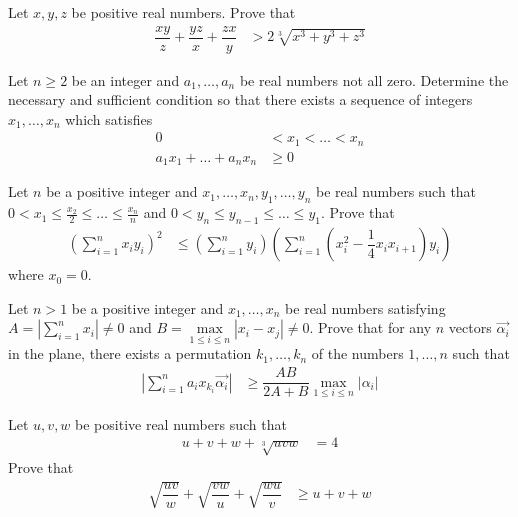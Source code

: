 \documentclass{subfile}
\begin{document}
		\begin{problem}
			Let $x,y,z$ be positive real numbers. Prove that
				\begin{align*}
					\dfrac{xy}{z}+\dfrac{yz}{x}+\dfrac{zx}{y}
						& > 2\sqrt[3]{x^{3}+y^{3}+z^{3}}
				\end{align*}
		\end{problem}
	
		\begin{problem}
			Let $n\geq 2$ be an integer and $a_{1},\ldots,a_{n}$ be real numbers not all zero. Determine the necessary and sufficient condition so that there exists a sequence of integers $x_{1},\ldots,x_{n}$ which satisfies
				\begin{align*}
					0
						& < x_{1} <\ldots<x_{n}\\
					a_{1}x_{1}+\ldots+a_{n}x_{n}
						& \geq 0
				\end{align*}
		\end{problem}
	
		\begin{problem}
			Let $n$ be a positive integer and $x_{1},\ldots,x_{n},y_{1},\ldots,y_{n}$ be real numbers such that $0<x_{1}\leq\frac{x_{2}}{2}\leq\ldots\leq\frac{x_{n}}{n}$ and $0<y_{n}\leq y_{n-1}\leq\ldots\leq y_{1}$. Prove that
				\begin{align*}
					\left(\sum_{i=1}^{n}x_{i}y_{i}\right)^{2}
						& \leq \left(\sum_{i=1}^{n}y_{i}\right)\left(\sum_{i=1}^{n}\left(x_{i}^{2}-\dfrac{1}{4}x_{i}x_{i+1}\right)y_{i}\right)
				\end{align*}
			where $x_{0}=0$.
		\end{problem}
	
		\begin{problem}
			Let $n>1$ be a positive integer and $x_{1},\ldots,x_{n}$ be real numbers satisfying $A=\left|\sum_{i=1}^{n}x_{i}\right|\neq0$ and $B=\max\limits_{1\leq i\leq n}|x_{i}-x_{j}|\neq0$. Prove that for any $n$ vectors $\overrightarrow{\alpha_{i}}$ in the plane, there exists a permutation $k_{1},\ldots,k_{n}$ of the numbers $1,\ldots,n$ such that
				\begin{align*}
					\left|\sum_{i=1}^{n}a_{i}x_{k_{i}}\overrightarrow{\alpha_{i}}\right|
						& \geq \dfrac{AB}{2A+B}\max_{1\leq i\leq n}|\alpha_{i}|
				\end{align*}
		\end{problem}
	
		\begin{problem}
			Let $u,v,w$ be positive real numbers such that
				\begin{align*}
					u+v+w+\sqrt[3]{uvw}
						& = 4
				\end{align*}
			Prove that
				\begin{align*}
					\sqrt{\dfrac{uv}{w}}+\sqrt{\dfrac{vw}{u}}+\sqrt{\dfrac{wu}{v}}
						& \geq u+v+w
				\end{align*}
		\end{problem}
	
\end{document}
